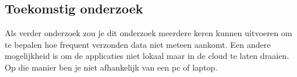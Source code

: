 \documentclass[a0,portrait]{a0poster}
\begin{document}
\begin{multicols}{2}
\section*{Toekomstig onderzoek}
\color{black}

Als verder onderzoek zou je dit onderzoek meerdere keren kunnen uitvoeren om te bepalen hoe frequent verzonden data niet meteen aankomt. Een andere mogelijkheid is om de applicaties niet lokaal maar in de cloud te laten draaien. Op die manier ben je niet afhankelijk van een pc of laptop.



\end{multicols}
\end{document}
